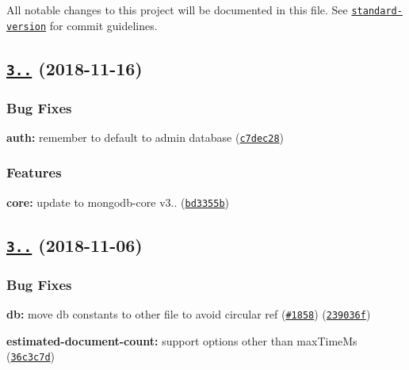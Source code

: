 All notable changes to this project will be documented in this file. See \href{https://github.com/conventional-changelog/standard-version}{\tt standard-\/version} for commit guidelines.

\label{_3.1.10}%
 \subsection*{\href{https://github.com/mongodb/node-mongodb-native/compare/v3.1.9...v3.1.10}{\tt 3..} (2018-\/11-\/16)}

\subsubsection*{Bug Fixes}


\begin{DoxyItemize}
\item {\bfseries auth\+:} remember to default to admin database (\href{https://github.com/mongodb/node-mongodb-native/commit/c7dec28}{\tt c7dec28})
\end{DoxyItemize}

\subsubsection*{Features}


\begin{DoxyItemize}
\item {\bfseries core\+:} update to mongodb-\/core v3.. (\href{https://github.com/mongodb/node-mongodb-native/commit/bd3355b}{\tt bd3355b})
\end{DoxyItemize}

\label{_3.1.9}%
 \subsection*{\href{https://github.com/mongodb/node-mongodb-native/compare/v3.1.8...v3.1.9}{\tt 3..} (2018-\/11-\/06)}

\subsubsection*{Bug Fixes}


\begin{DoxyItemize}
\item {\bfseries db\+:} move db constants to other file to avoid circular ref (\href{https://github.com/mongodb/node-mongodb-native/issues/1858}{\tt \#1858}) (\href{https://github.com/mongodb/node-mongodb-native/commit/239036f}{\tt 239036f})
\item {\bfseries estimated-\/document-\/count\+:} support options other than max\+Time\+Ms (\href{https://github.com/mongodb/node-mongodb-native/commit/36c3c7d}{\tt 36c3c7d})
\end{DoxyItemize}

